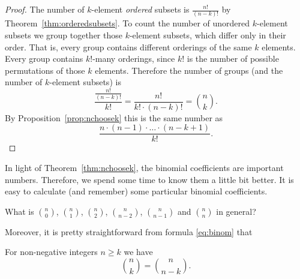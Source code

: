 \begin{proof}
The number of $k$-element \emph{ordered} subsets is $\frac{n!}{(n-k)!}$ by Theorem~\ref{thm:orderedsubsets}. 
To count the number of unordered $k$-element subsets we group together those $k$-element subsets, 
which differ only in their order. 
That is, 
every group contains different orderings of the same $k$ elements. 
Every group contains $k!$-many orderings, 
since $k!$ is the number of possible permutations of those $k$ elements. 
Therefore the number of groups (and the number of $k$-element subsets) is
\[
\frac{\frac{n!}{(n-k)!}}{k!} = \frac{n!}{k! \cdot (n-k)!} = \binom{n}{k}. 
\]
By Proposition~\ref{prop:nchoosek} this is the same number as 
\[
\frac{n \cdot (n-1) \cdot \dots \cdot (n-k+1)}{k!}. 
\]
\end{proof}

In light of Theorem~\ref{thm:nchoosek}, the binomial coefficients are important numbers. 
Therefore, we spend some time to know them a little bit better. 
It is easy to calculate (and remember) some particular binomial coefficients. 

\begin{exercise}\label{ex:nicenchoosek}
What is $\binom{n}{0}$, $\binom{n}{1}$, $\binom{n}{2}$, $\binom{n}{n-2}$, $\binom{n}{n-1}$ and $\binom{n}{n}$ in general? 
\end{exercise}

Moreover, it is pretty straightforward from formula \eqref{eq:binom} that 
\begin{proposition}\label{prop:symmetryofbinomial}
For non-negative integers $n\geq k$ we have 
\[
\binom{n}{k} = \binom{n}{n-k}. 
\]
\end{proposition}

